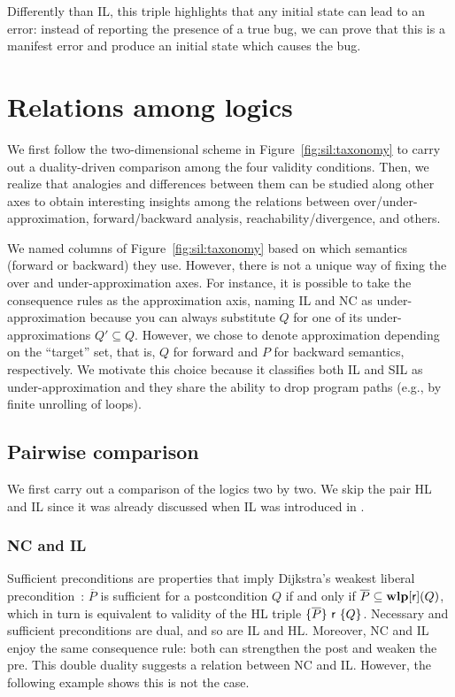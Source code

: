\begin{example}
	Differently than IL, this triple highlights that any initial state can lead to an error: instead of reporting the presence of a true bug, we can prove that this is a manifest error and produce an initial state which causes the bug.
\end{example}

\section{Relations among logics}\label{sec:sil:comparison}
We first follow the two-dimensional scheme in Figure~\ref{fig:sil:taxonomy} to carry out a duality-driven comparison among the four validity conditions. Then, we realize that analogies and differences between them can be studied along other axes to obtain interesting insights among the relations between over/under-approximation, forward/backward analysis, reachability/divergence, and others.

We named columns of Figure~\ref{fig:sil:taxonomy} based on which semantics (forward or backward) they use. However, there is not a unique way of fixing the over and under-approximation axes. For instance, it is possible to take the consequence rules as the approximation axis, naming IL and NC as under-approximation because you can always substitute $Q$ for one of its under-approximations $Q' \subseteq Q$. However, we chose to denote approximation depending on the ``target'' set, that is, $Q$ for forward and $P$ for backward semantics, respectively. We motivate this choice because it classifies both IL and SIL as under-approximation and they share the ability to drop program paths (e.g., by finite unrolling of loops).

\subsection{Pairwise comparison}
We first carry out a comparison of the logics two by two. We skip the pair HL and IL since it was already discussed when IL was introduced in \cite{OHearn20}.

\subsubsection{NC and IL}
Sufficient preconditions are properties that imply Dijkstra's weakest liberal precondition~\cite{Dijkstra75}: $\overline{P}$ is sufficient for a postcondition $Q$ if and only if $\overline{P} \subseteq \textbf{wlp}[\mathsf{r}](Q)$, which in turn is equivalent to validity of the HL triple $\{\overline{P}\}~\mathsf{r}~\{Q\}$. Necessary and sufficient preconditions are dual, and so are IL and HL. Moreover, NC and IL enjoy the same consequence rule: both can strengthen the post and weaken the pre. This double duality suggests a relation between NC and IL. However, the following example shows this is not the case.

